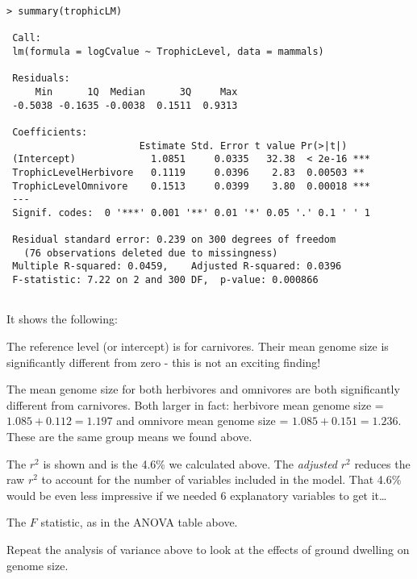 \begin{lstlisting}
> summary(trophicLM)
 
 Call:
 lm(formula = logCvalue ~ TrophicLevel, data = mammals)
 
 Residuals:
     Min      1Q  Median      3Q     Max 
 -0.5038 -0.1635 -0.0038  0.1511  0.9313 
 
 Coefficients:
                       Estimate Std. Error t value Pr(>|t|)    
 (Intercept)             1.0851     0.0335   32.38  < 2e-16 ***
 TrophicLevelHerbivore   0.1119     0.0396    2.83  0.00503 ** 
 TrophicLevelOmnivore    0.1513     0.0399    3.80  0.00018 ***
 ---
 Signif. codes:  0 '***' 0.001 '**' 0.01 '*' 0.05 '.' 0.1 ' ' 1 
 
 Residual standard error: 0.239 on 300 degrees of freedom
   (76 observations deleted due to missingness)
 Multiple R-squared: 0.0459,	Adjusted R-squared: 0.0396 
 F-statistic: 7.22 on 2 and 300 DF,  p-value: 0.000866 
 
\end{lstlisting} 

It shows the following:

\begin{compactitem}

	\item The reference level (or intercept) is for carnivores. Their 
	mean genome size is significantly different from zero - this is not 
	an exciting finding!

	\item The mean genome size for both herbivores and omnivores are both 
	significantly different from carnivores. Both larger in fact: 
	herbivore mean genome size = $1.085 + 0.112 = 1.197$ and omnivore 
	mean genome size = $1.085 + 0.151 = 1.236$. These are the same group 
	means we found above.

	\item The $r^2$ is shown and is the 4.6\% we calculated above. The 
	{\it adjusted} $r^2$ reduces the raw $r^2$ to account for the number 
	of variables included in the model. That 4.6\% would be even less 
	impressive if we needed 6 explanatory variables to get it\ldots

	\item The $F$ statistic, as in the ANOVA table above.

\end{compactitem}

\begin{compactitem}[$\quad\star$]
	\item Repeat the analysis of variance above to look at the effects of 
	ground dwelling on genome size.
\end{compactitem}

